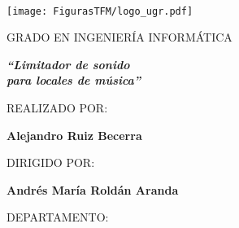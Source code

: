 \newpage
\thispagestyle{empty}

~

\newpage
\thispagestyle{empty}

\begin{center}
\texttt{[image: FigurasTFM/logo\_ugr.pdf]}
\par\end{center}

\begin{center}
GRADO EN INGENIERÍA INFORMÁTICA\par\end{center}

\begin{center}
\vspace*{0.1cm}
\par\end{center}

\begin{center}
\textbf{\emph{\LARGE {}``Limitador de sonido}}\\
\textbf{\emph{\LARGE {} para locales de música''}}
\par\end{center}{\Large \par}

\begin{center}
\vspace*{0.3cm}
\par\end{center}

\begin{center}
REALIZADO POR:
\par\end{center}

\begin{center}
\textbf{Alejandro Ruiz Becerra}
\par\end{center}

\begin{center}
DIRIGIDO POR:
\par\end{center}

\begin{center}
\textbf{Andrés María Roldán Aranda}
\par\end{center}

\begin{center}
DEPARTAMENTO:
\par\end{center}

